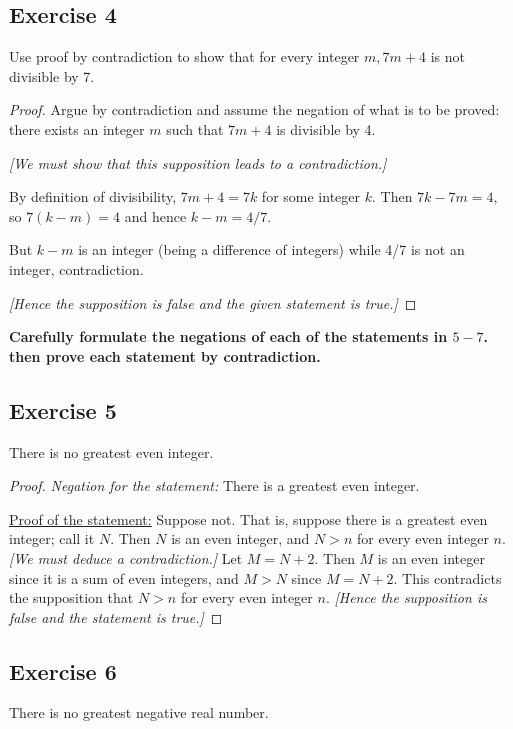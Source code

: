 \documentclass[14pt]{extarticle}
\newcommand{\cy}{\color{cyan}}
\begin{document}
\subsection{Exercise 4}
Use proof by contradiction to show that for every integer $m, 7m + 4$ is not divisible by 7.

\begin{proof}
    Argue by contradiction and assume the negation of what is to be proved: there exists an integer $m$ such that $7m+4$ is divisible by 4.

        {\it [We must show that this supposition leads to a contradiction.]}

    By definition of divisibility, $7m+4 = 7k$ for some integer $k$. Then $7k-7m = 4$, so $7(k-m) = 4$ and hence $k-m = 4/7$.

    But $k-m$ is an integer (being a difference of integers) while 4/7 is not an integer, contradiction.

        {\it [Hence the supposition is false and the given statement is true.]}
\end{proof}

{\bf \cy Carefully formulate the negations of each of the statements in $5-7$. then prove each statement by contradiction.}

\subsection{Exercise 5}
There is no greatest even integer.

\begin{proof}
    {\it Negation for the statement:} There is a greatest even
    integer.

    \underline{Proof of the statement:} Suppose not. That is, suppose there is a greatest even integer; call it $N$. Then $N$ is an even integer, and $N > n$ for every even integer $n$. {\it [We must deduce a contradiction.]} Let $M = N + 2$. Then $M$ is an even integer since it is a sum of even integers, and $M > N$ since $M = N + 2$. This contradicts the supposition that $N > n$ for every even integer $n$. {\it [Hence the supposition is false and the statement is true.]}
\end{proof}

\subsection{Exercise 6}
There is no greatest negative real number.
\end{document}

